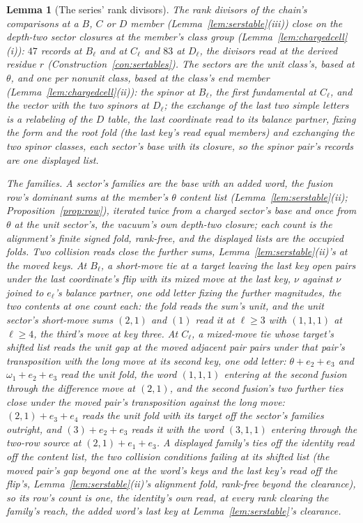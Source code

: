 \documentclass[11pt]{article}
\newtheorem{lemma}{Lemma}
\theoremstyle{definition}
\begin{document}
\begin{lemma}[The series' rank divisors]
\label{lem:serdivisors}
The rank divisors of the chain's comparisons at a $B$, $C$ or $D$
member (Lemma~\ref{lem:serstable}(iii)) close on the depth-two
sector closures at the member's class group
(Lemma~\ref{lem:chargedcell}(i)): $47$ records at $B_\ell$ and at
$C_\ell$ and $83$ at $D_\ell$, the divisors read at the derived
residue $r$ (Construction~\ref{con:sertables}). The sectors are
the unit class's, based at $\theta$, and one per nonunit class,
based at the class's end member
(Lemma~\ref{lem:chargedcell}(ii)): the spinor at $B_\ell$, the
first fundamental at $C_\ell$, and the vector with the two
spinors at $D_\ell$; the exchange of the last two simple letters
is a relabeling of the $D$ table, the last coordinate read to its
balance partner, fixing the form and the root fold (the last
key's read equal members) and exchanging the two spinor classes,
each sector's base with its closure, so the spinor pair's records
are one displayed list.

\emph{The families.} A sector's families are the base with an
\emph{added word}, the fusion row's dominant sums at the member's
$\theta$ content list
(Lemma~\ref{lem:serstable}(ii); Proposition~\ref{prop:row}),
iterated twice from a charged sector's base and once from
$\theta$ at the unit sector's, the vacuum's own depth-two
closure; each
count is the alignment's finite signed fold, rank-free, and the
displayed lists are the occupied folds. Two collision reads close
the further sums, Lemma~\ref{lem:serstable}(ii)'s at the moved
keys. At $B_\ell$, a short-move tie at a target leaving the last
key open pairs under the last coordinate's flip with its mixed
move at the last key, $\nu$ against $\nu$ joined to
$e_\ell$'s balance partner, one odd letter fixing the further
magnitudes, the two contents at one count each: the fold reads
the sum's unit, and the unit sector's short-move sums $(2,1)$
and $(1)$ read it at $\ell\ge3$ with $(1,1,1)$ at $\ell\ge4$,
the third's move at key three. At $C_\ell$, a mixed-move tie whose target's
shifted list reads the unit gap at the moved adjacent pair pairs
under that pair's transposition with the long move at its second
key, one odd letter: $\theta+e_2+e_3$ and $\omega_1+e_2+e_3$ read
the unit fold, the word $(1,1,1)$ entering at the second fusion
through the difference move at $(2,1)$, and the second fusion's
two further ties close under the moved pair's transposition
against the long move: $(2,1)+e_3+e_4$
reads the unit fold with its target off the sector's families
outright, and $(3)+e_2+e_3$ reads it with the word $(3,1,1)$
entering through the two-row source at $(2,1)+e_1+e_3$. A displayed family's ties
off the identity read off the content list, the two collision
conditions failing at its shifted list (the moved pair's gap
beyond one at the word's keys and the last key's read off the
flip's, Lemma~\ref{lem:serstable}(ii)'s alignment fold, rank-free
beyond the clearance), so its row's count is one, the
identity's own read, at every rank clearing the family's reach,
the added word's last key at Lemma~\ref{lem:serstable}'s
clearance.


\end{lemma}
\end{document}
